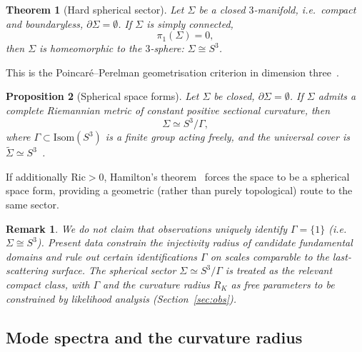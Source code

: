 \documentclass[12pt,a4paper]{article}
\newtheorem{theorem}{Theorem}[section]
\newtheorem{proposition}[theorem]{Proposition}
\newtheorem{remark}{Remark}[section]
\newcommand{\Sig}{\Sigma}           %
\newcommand{\pa}{\partial}          %
\newcommand{\RK}{R_K}
\begin{document}
\begin{theorem}[Hard spherical sector]
\label{thm:hard}
Let $\Sig$ be a closed $3$-manifold, i.e.\ compact and
boundaryless, $\pa\Sig = \emptyset$. If $\Sig$ is simply
connected,
\begin{equation}
  \pi_1(\Sig) = 0,
\end{equation}
then $\Sig$ is homeomorphic to the $3$-sphere:
$\Sig \cong S^3$.
\end{theorem}

This is the Poincar\'e--Perelman geometrisation criterion
in dimension three~\cite{Perelman1,Perelman2,Perelman3,
MorganTian2007,KleinerLott2008}.

\begin{proposition}[Spherical space forms]
\label{prop:soft}
Let $\Sig$ be closed, $\pa\Sig = \emptyset$. If $\Sig$
admits a complete Riemannian metric of constant positive
sectional curvature, then
\begin{equation}
  \Sig \simeq S^3/\Gamma,
  \label{eq:spacefom}
\end{equation}
where $\Gamma \subset \mathrm{Isom}(S^3)$ is a finite group
acting freely, and the universal cover is $\widetilde{\Sig}
\simeq S^3$~\cite{Wolf2011,Scott1983}.
\end{proposition}

If additionally $\mathrm{Ric} > 0$, Hamilton's theorem~\cite{Hamilton1982}
forces the space to be a spherical space form, providing
a geometric (rather than purely topological) route to the
same sector.

\begin{remark}
We do not claim that observations uniquely identify
$\Gamma = \{1\}$ (i.e.\ $\Sig \cong S^3$). Present data
constrain the injectivity radius of candidate fundamental
domains and rule out certain identifications $\Gamma$ on
scales comparable to the last-scattering surface. The
spherical sector $\Sig \simeq S^3/\Gamma$ is treated as
the relevant compact class, with $\Gamma$ and the curvature
radius $\RK$ as free parameters to be constrained by
likelihood analysis (Section~\ref{sec:obs}).
\end{remark}

\subsection{Mode spectra and the curvature radius}
\end{document}

